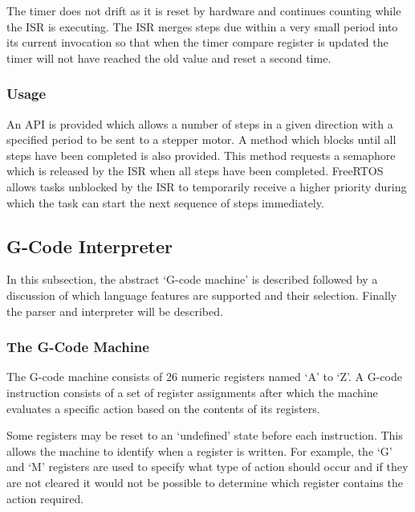 				The timer does not drift as it is reset by hardware and continues
				counting while the ISR is executing. The ISR merges steps due within a
				very small period into its current invocation so that when the timer
				compare register is updated the timer will not have reached the old
				value and reset a second time.
			
			\subsubsection{Usage}
				
				An API is provided which allows a number of steps in a given direction
				with a specified period to be sent to a stepper motor. A method which
				blocks until all steps have been completed is also provided. This method
				requests a semaphore which is released by the ISR when all steps have
				been completed. FreeRTOS allows tasks unblocked by the ISR to
				temporarily receive a higher priority during which the task can start
				the next sequence of steps immediately.
		
		\subsection{G-Code Interpreter}
			
			In this subsection, the abstract `G-code machine' is described followed by
			a discussion of which language features are supported and their selection.
			Finally the parser and interpreter will be described.
			
			\subsubsection{The G-Code Machine}
				
				\label{sec:gcodemachine}
				
				The G-code machine consists of 26 numeric registers named `A' to `Z'.
				A G-code instruction consists of a set of register assignments after
				which the machine evaluates a specific action based on the contents of
				its registers.
				
				Some registers may be reset to an `undefined' state before each
				instruction. This allows the machine to identify when a register is
				written. For example, the `G' and `M' registers are used to specify what
				type of action should occur and if they are not cleared it would not be
				possible to determine which register contains the action required.
				
